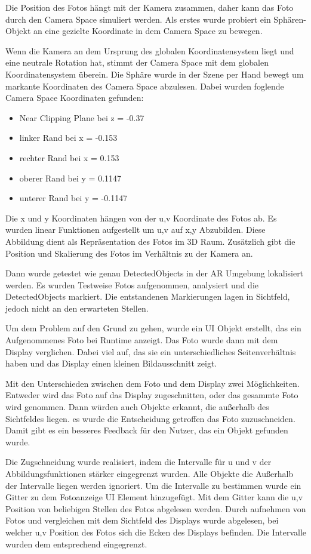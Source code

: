 \documentclass[german,a4paper, 12pt]{llncs}
\begin{document}
Die Position des Fotos hängt mit der Kamera zusammen, daher kann das Foto durch den Camera Space simuliert werden. Als erstes wurde probiert ein Sphären-Objekt an eine gezielte Koordinate in dem Camera Space zu bewegen. 

Wenn die Kamera an dem Ursprung des globalen Koordinatensystem liegt und eine neutrale Rotation hat, stimmt der Camera Space mit dem globalen Koordinatensystem überein. Die Sphäre wurde in der Szene per Hand bewegt um markante Koordinaten des Camera Space abzulesen. Dabei wurden foglende Camera Space Koordinaten gefunden:
\begin{itemize}
	\item Near Clipping Plane bei z = -0.37
	\item linker Rand bei x = -0.153
	\item rechter Rand bei x = 0.153
	\item oberer Rand bei y = 0.1147
	\item unterer Rand bei y = -0.1147
\end{itemize}

Die x und y Koordinaten hängen von der u,v Koordinate des Fotos ab. Es wurden linear Funktionen aufgestellt um u,v auf x,y Abzubilden. Diese Abbildung dient als Repräsentation des Fotos im 3D Raum. Zusätzlich gibt die Position und Skalierung des Fotos im Verhältnis zu der Kamera an.

Dann wurde getestet wie genau DetectedObjects in der AR Umgebung lokalisiert werden. Es wurden Testweise Fotos aufgenommen, analysiert und die DetectedObjects markiert. Die entstandenen Markierungen lagen in Sichtfeld, jedoch nicht an den erwarteten Stellen. 

Um dem Problem auf den Grund zu gehen, wurde ein UI Objekt erstellt, das ein Aufgenommenes Foto bei Runtime anzeigt.
Das Foto wurde dann mit dem Display verglichen. Dabei viel auf, das sie ein unterschiedliches Seitenverhältnis haben und das Display einen kleinen Bildausschnitt zeigt.  

Mit den Unterschieden zwischen dem Foto und dem Display zwei Möglichkeiten. Entweder wird das Foto auf das Display zugeschnitten, oder das gesammte Foto wird genommen. Dann würden auch Objekte erkannt, die außerhalb des Sichtfeldes liegen.
es wurde die Entscheidung getroffen das Foto zuzuschneiden. Damit gibt es ein besseres Feedback für den Nutzer, das ein Objekt gefunden wurde. 

Die Zugschneidung wurde realisiert, indem die Intervalle für u und v der Abbildungsfunktionen stärker eingegrenzt wurden. Alle Objekte die Außerhalb der Intervalle liegen werden ignoriert. Um die Intervalle zu bestimmen wurde ein Gitter zu dem Fotoanzeige UI Element hinzugefügt. Mit dem Gitter kann die u,v Position von beliebigen Stellen des Fotos abgelesen werden. 
Durch aufnehmen von Fotos und vergleichen mit dem Sichtfeld des Displays wurde abgelesen, bei welcher u,v Position des Fotos sich die Ecken des Displays befinden. Die Intervalle wurden dem entsprechend eingegrenzt. 
\end{document}
